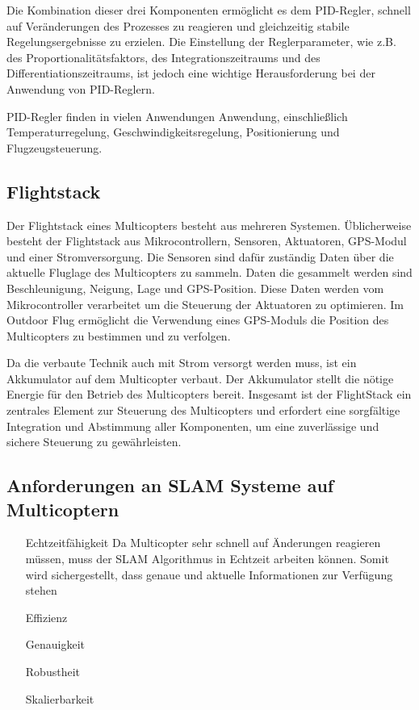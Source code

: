Die Kombination dieser drei Komponenten ermöglicht es dem PID-Regler, schnell auf Veränderungen des Prozesses zu reagieren und gleichzeitig stabile Regelungsergebnisse zu erzielen. Die Einstellung der Reglerparameter, wie z.B. des Proportionalitätsfaktors, des Integrationszeitraums und des Differentiationszeitraums, ist jedoch eine wichtige Herausforderung bei der Anwendung von PID-Reglern.

PID-Regler finden in vielen Anwendungen Anwendung, einschließlich Temperaturregelung, Geschwindigkeitsregelung, Positionierung und Flugzeugsteuerung.
   
\subsection{Flightstack}

Der Flightstack eines Multicopters besteht aus mehreren Systemen. Üblicherweise besteht der Flightstack aus Mikrocontrollern, Sensoren, Aktuatoren, GPS-Modul und einer Stromversorgung. Die Sensoren sind dafür zuständig Daten über die aktuelle Fluglage des Multicopters zu sammeln. Daten die gesammelt werden sind Beschleunigung, Neigung, Lage und GPS-Position. Diese Daten werden vom Mikrocontroller verarbeitet um die Steuerung der Aktuatoren zu optimieren. Im Outdoor Flug ermöglicht die Verwendung eines GPS-Moduls die Position des Multicopters zu bestimmen und zu verfolgen.

Da die verbaute Technik auch mit Strom versorgt werden muss, ist ein Akkumulator auf dem Multicopter verbaut. Der Akkumulator stellt die nötige Energie für den Betrieb des Multicopters bereit. Insgesamt ist der FlightStack ein zentrales Element zur Steuerung des Multicopters und erfordert eine sorgfältige Integration und Abstimmung aller Komponenten, um eine zuverlässige und sichere Steuerung zu gewährleisten.
\subsection{Anforderungen an SLAM Systeme auf Multicoptern}

\begin{itemize}
    \item[Echtzeitfähigkeit]{Da Multicopter sehr schnell auf Änderungen reagieren müssen, muss der SLAM Algorithmus in Echtzeit arbeiten können. Somit wird sichergestellt, dass genaue und aktuelle Informationen zur Verfügung stehen}
    \item[Effizienz]
    \item[Genauigkeit]
    \item[Robustheit]
    \item[Skalierbarkeit]    
\end{itemize}

